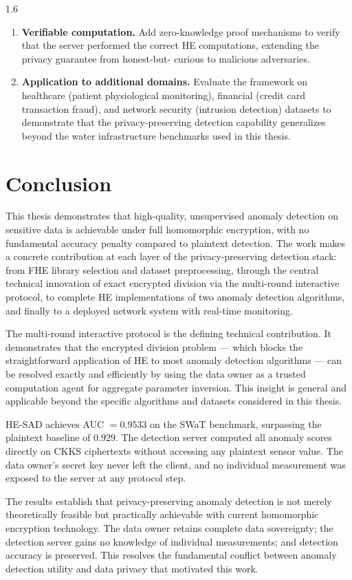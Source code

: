 \begin{spacing}{1.6}
\begin{enumerate}
  \item \textbf{Verifiable computation.}
  Add zero-knowledge proof mechanisms to verify that the server performed the
  correct HE computations, extending the privacy guarantee from honest-but-
  curious to malicious adversaries.

  \item \textbf{Application to additional domains.}
  Evaluate the framework on healthcare (patient physiological monitoring),
  financial (credit card transaction fraud), and network security (intrusion
  detection) datasets to demonstrate that the privacy-preserving detection
  capability generalizes beyond the water infrastructure benchmarks used in
  this thesis.
\end{enumerate}

\section{Conclusion}

This thesis demonstrates that high-quality, unsupervised anomaly detection on
sensitive data is achievable under full homomorphic encryption, with no
fundamental accuracy penalty compared to plaintext detection. The work makes
a concrete contribution at each layer of the privacy-preserving detection
stack: from FHE library selection and dataset preprocessing, through the
central technical innovation of exact encrypted division via the multi-round
interactive protocol, to complete HE implementations of two anomaly detection
algorithms, and finally to a deployed network system with real-time monitoring.

The multi-round interactive protocol is the defining technical contribution.
It demonstrates that the encrypted division problem --- which blocks the
straightforward application of HE to most anomaly detection algorithms ---
can be resolved exactly and efficiently by using the data owner as a trusted
computation agent for aggregate parameter inversion. This insight is general
and applicable beyond the specific algorithms and datasets considered in this
thesis.

HE-SAD achieves AUC $= 0.9533$ on the SWaT benchmark, surpassing the plaintext
baseline of $0.929$. The detection server computed all anomaly scores directly
on CKKS ciphertexts without accessing any plaintext sensor value. The data
owner's secret key never left the client, and no individual measurement was
exposed to the server at any protocol step.

The results establish that privacy-preserving anomaly detection is not merely
theoretically feasible but practically achievable with current homomorphic
encryption technology. The data owner retains complete data sovereignty; the
detection server gains no knowledge of individual measurements; and detection
accuracy is preserved. This resolves the fundamental conflict between anomaly
detection utility and data privacy that motivated this work.

\end{spacing}
